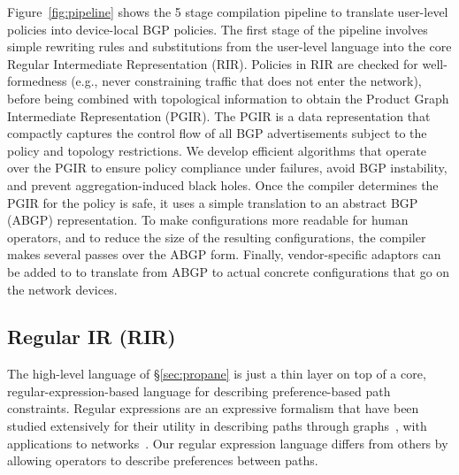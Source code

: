 Figure~\ref{fig:pipeline} shows the 5 stage compilation pipeline to translate user-level \sysname policies into device-local BGP policies. The first stage of the pipeline involves simple rewriting rules and substitutions from the user-level language into the core Regular Intermediate Representation (RIR). Policies in RIR are checked for well-formedness (e.g., never constraining traffic that does not enter the network), before being combined with topological information to obtain the Product Graph Intermediate Representation (PGIR). The PGIR is a data representation that compactly captures the control flow of all BGP advertisements subject to the policy and topology restrictions. We develop efficient algorithms that operate over the PGIR to ensure policy compliance under failures, avoid BGP instability, and prevent aggregation-induced black holes. Once the compiler determines the PGIR for the policy is safe, it uses a simple translation to an abstract BGP (ABGP) representation. To make configurations more readable for human operators, and to reduce the size of the resulting configurations, the \sysname compiler makes several passes over the ABGP form. Finally, vendor-specific adaptors can be added to \sysname to translate from ABGP to actual concrete configurations that go on the network devices.


\subsection{Regular IR (RIR)}
\label{sec:rir}

The high-level language of \S\ref{sec:propane} is just a thin layer on top of a core, regular-expression-based language for describing preference-based path constraints. Regular expressions are an expressive formalism that have been studied extensively for their utility in describing paths through graphs~\cite{bib:todo}, with applications to networks~\cite{bib:todo}. Our regular expression language differs from others by allowing operators to describe preferences between paths.

\newcommand{\BNFALT}{\;\;|\;\;}
\newcommand{\hdr}[2]{\flushleft \chdr{#1}{#2}}
\newcommand{\chdr}[2]{\textbf{#1} {#2} \\ \centering}

